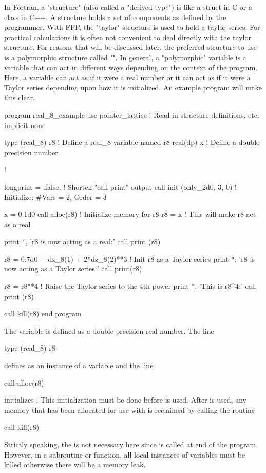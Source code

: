 \documentclass[english,12pt,article]{article} %
\begin{document}
In Fortran, a "structure" (also called a "derived type") is like a struct in C or a class in C++. A structure holds a set of components as defined by the programmer. With FPP, the "taylor" structure is used to hold a taylor series. For practical calculations it is often not convenient to deal directly with the taylor structure. For reasons that will be discussed later, the preferred structure to use is a polymorphic structure called "". In general, a "polymorphic" variable is a variable that can act in different ways depending on the context of the program. Here, a  variable can act as if it were a real number or it can act as if it were a Taylor series depending upon how it is initialized.
An example program will make this clear.
\begin{code}
  program real_8_example
  use pointer_lattice   ! Read in structure definitions, etc.
  implicit none

  type (real_8) r8      ! Define a real_8 variable named r8
  real(dp) x            ! Define a double precision number

  !

  longprint = .false.         ! Shorten "call print" output
  call init (only_2d0, 3, 0)  ! Initialize: #Vars = 2, Order = 3

  x = 0.1d0
  call alloc(r8)          ! Initialize memory for r8
  r8 = x                  ! This will make r8 act as a real

  print *, 'r8 is now acting as a real:'
  call print (r8)

  r8 = 0.7d0 + dz_8(1) + 2*dz_8(2)**3 ! Init r8 as a Taylor series
  print *, 'r8 is now acting as a Taylor series:'
  call print(r8)

  r8 = r8**4  ! Raise the Taylor series to the 4th power
  print *, 'This is r8^4:'
  call print (r8)

  call kill(r8)
  end program
\end{code}

The variable  is defined as a double precision real number. The line
\begin{example}
  type (real_8) r8
\end{example}
defines  as an instance of a  variable and the line
\begin{example}
  call alloc(r8)
\end{example}
initializes . This initialization must be done before  is used. After  is used, any memory that has been allocated for use with  is reclaimed by calling the  routine
\begin{example}
  call kill(r8)
\end{example}
Strictly speaking, the  is not necessary here since  is called at end of the program. However, in a subroutine or function, all local instances of  variables must be killed otherwise there will be a memory leak.
\end{document}
